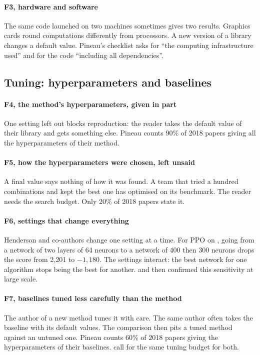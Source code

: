 \paragraph{F3, hardware and software}
The same code launched on two machines sometimes gives two results. Graphics cards round computations
differently from processors. A new version of a library changes a default value. Pineau's checklist
asks for \enquote{the computing infrastructure used} and for the code \enquote{including all
dependencies}.

\subsection{Tuning: hyperparameters and baselines}

\paragraph{F4, the method's hyperparameters, given in part}
One setting left out blocks reproduction: the reader takes the default value of their library and
gets something else. Pineau counts 90\% of 2018 papers giving all the hyperparameters of their method.

\paragraph{F5, how the hyperparameters were chosen, left unsaid}
A final value says nothing of how it was found. A team that tried a hundred combinations and kept the
best one has optimised on its benchmark. The reader needs the search budget. Only 20\% of 2018 papers
state it.

\paragraph{F6, settings that change everything}
Henderson and co-authors change one setting at a time. For PPO on , going from a
network of two layers of 64 neurons to a network of 400 then 300 neurons drops the score from
2,201 to $-1{,}180$. The settings interact: the best network for one algorithm stops being the
best for another. \textcite{engstrom2020implementation} and then \textcite{andrychowicz2021matters}
confirmed this sensitivity at large scale.

\paragraph{F7, baselines tuned less carefully than the method}
The author of a new method tunes it with care. The same author often takes the baseline with its
default values. The comparison then pits a tuned method against an untuned one. Pineau counts 60\% of
2018 papers giving the hyperparameters of their baselines. \textcite{eimer2023hyperparameters} call for
the same tuning budget for both.

